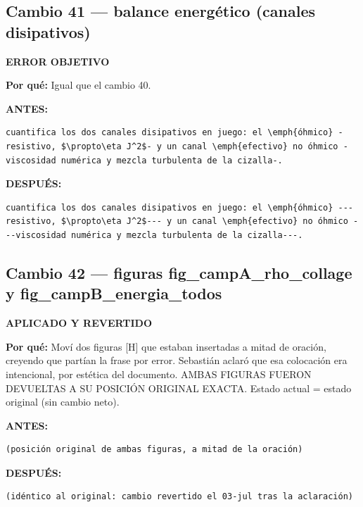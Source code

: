 \documentclass[11pt,a4paper]{article}
\begin{document}
\subsection*{Cambio 41 --- balance energético (canales disipativos)}
\colorbox{okbg}{\textbf{\footnotesize ERROR OBJETIVO}}

\textbf{Por qué:} Igual que el cambio 40.

\textcolor{antesline}{\textbf{ANTES:}}
\begin{Verbatim}[breaklines=true, breakanywhere=true, fontsize=\small, frame=leftline, rulecolor=\color{antesline}, framerule=1.2pt]
cuantifica los dos canales disipativos en juego: el \emph{óhmico} -resistivo, $\propto\eta J^2$- y un canal \emph{efectivo} no óhmico -viscosidad numérica y mezcla turbulenta de la cizalla-.
\end{Verbatim}
\textcolor{despline}{\textbf{DESPUÉS:}}
\begin{Verbatim}[breaklines=true, breakanywhere=true, fontsize=\small, frame=leftline, rulecolor=\color{despline}, framerule=1.2pt]
cuantifica los dos canales disipativos en juego: el \emph{óhmico} ---resistivo, $\propto\eta J^2$--- y un canal \emph{efectivo} no óhmico ---viscosidad numérica y mezcla turbulenta de la cizalla---.
\end{Verbatim}

\subsection*{Cambio 42 --- figuras fig\_campA\_rho\_collage y fig\_campB\_energia\_todos}
\colorbox{revbg}{\textbf{\footnotesize APLICADO Y REVERTIDO}}

\textbf{Por qué:} Moví dos figuras [H] que estaban insertadas a mitad de oración, creyendo que partían la frase por error. Sebastián aclaró que esa colocación era intencional, por estética del documento. AMBAS FIGURAS FUERON DEVUELTAS A SU POSICIÓN ORIGINAL EXACTA. Estado actual = estado original (sin cambio neto).

\textcolor{antesline}{\textbf{ANTES:}}
\begin{Verbatim}[breaklines=true, breakanywhere=true, fontsize=\small, frame=leftline, rulecolor=\color{antesline}, framerule=1.2pt]
(posición original de ambas figuras, a mitad de la oración)
\end{Verbatim}
\textcolor{despline}{\textbf{DESPUÉS:}}
\begin{Verbatim}[breaklines=true, breakanywhere=true, fontsize=\small, frame=leftline, rulecolor=\color{despline}, framerule=1.2pt]
(idéntico al original: cambio revertido el 03-jul tras la aclaración)
\end{Verbatim}
\end{document}

